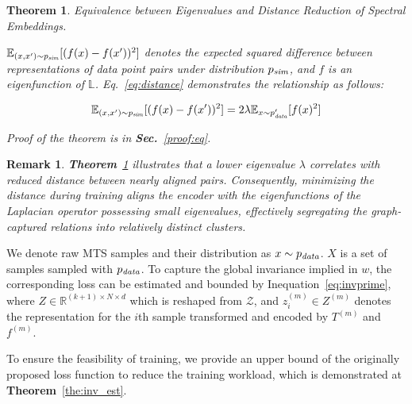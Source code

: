 \documentclass{article}
\newtheorem{theorem}{\textbf{Theorem}} %
\newtheorem{remark}{Remark} %
\begin{document}
\begin{theorem}\label{the:seman_sim}
Equivalence between Eigenvalues and Distance Reduction of Spectral Embeddings.

$\mathbb{E}_{(x, x^\prime)\sim p_{\text{\textit{sim}}}} [(f(x) - f(x^\prime))^2]$ denotes the expected squared difference between representations of data point pairs under distribution $p_{\text{\textit{sim}}}$, and $f$ is an eigenfunction of $\mathbb{L}$. Eq.~\ref{eq:distance} demonstrates the relationship as follows:

\begin{equation}\label{eq:distance}
    \mathbb{E}_{(x, x^\prime)\sim p_{\text{\textit{sim}}}} [(f(x) - f(x^\prime))^2] = 2\lambda\mathbb{E}_{x \sim p_{\text{\textit{data}}}^\prime}[f(x)^2]
\end{equation}

Proof of the theorem is in \textbf{Sec.}~\ref{proof:eq}.
\end{theorem}



\begin{remark}
\textbf{Theorem}~\ref{the:seman_sim} illustrates that a lower eigenvalue $\lambda$ correlates with reduced distance between nearly aligned pairs. Consequently, minimizing the distance during training aligns the encoder with the eigenfunctions of the Laplacian operator possessing small eigenvalues, effectively segregating the graph-captured relations into relatively distinct clusters.
\end{remark}

We denote raw MTS samples and their distribution as $x \sim p_{\text{\textit{data}}}$. $X$ is a set of samples sampled with $p_{\text{\textit{data}}}$. To capture the global invariance implied in $w$, the corresponding loss can be estimated and bounded by Inequation~\ref{eq:invprime}, where $Z \in \mathbb{R}^{(k+1)\times N \times d }$ which is reshaped from $\mathcal{Z}$, and $z_i^{(m)} \in Z^{(m)}$ denotes the representation for the $i$th sample transformed and encoded by $T^{(m)}$ and $f^{(m)}$. 

To ensure the feasibility of training, we provide an upper bound of the originally proposed loss function to reduce the training workload, which is demonstrated at \textbf{Theorem}~\ref{the:inv_est}.
\end{document}
